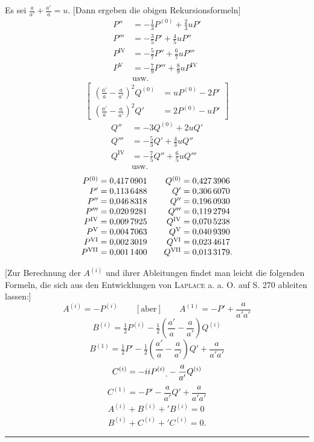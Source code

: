 Es sei \(\frac a{a'}+\frac{a'}a=u\). [Dann ergeben die obigen Rekursionsformeln]
\[
\begin{aligned}
P''&=-\tfrac13P^{(0)}+\tfrac23uP'\\
P'''&=-\tfrac35P'+\tfrac45uP''\\
P^{\mathrm{IV}}&=-\tfrac57P''+\tfrac67uP'''\\
P^{\mathrm{V}}&=-\tfrac79P'''+\tfrac89uP^{\mathrm{IV}}\\
&\text{usw.}
\end{aligned}
\]
\[
\left[\begin{aligned}
\left(\frac{a'}a-\frac a{a'}\right)^2Q^{(0)}&=uP^{(0)}-2P'\\
\left(\frac{a'}a-\frac a{a'}\right)^2Q'&=2P^{(0)}-uP'
\end{aligned}\right]
\]
\[
\begin{aligned}
Q''&=-3Q^{(0)}+2uQ'\\
Q'''&=-\tfrac53Q'+\tfrac43uQ''\\
Q^{\mathrm{IV}}&=-\tfrac75Q''+\tfrac65uQ'''\\
&\text{usw.}
\end{aligned}
\]
\hypertarget{native-392}{}
\[
\begin{array}{r@{\;}l@{\qquad}r@{\;}l}
P^{(0)}&=0{,}417\,0901&Q^{(0)}&=0{,}427\,3906\\
P'&=0{,}113\,6488&Q'&=0{,}306\,6070\\
P''&=0{,}046\,8318&Q''&=0{,}196\,0930\\
P'''&=0{,}020\,9281&Q'''&=0{,}119\,2794\\
P^{\mathrm{IV}}&=0{,}009\,7925&Q^{\mathrm{IV}}&=0{,}070\,5238\\
P^{\mathrm{V}}&=0{,}004\,7063&Q^{\mathrm{V}}&=0{,}040\,9390\\
P^{\mathrm{VI}}&=0{,}002\,3019&Q^{\mathrm{VI}}&=0{,}023\,4617\\
P^{\mathrm{VII}}&=0{,}001\,1400&Q^{\mathrm{VII}}&=0{,}013\,3179.
\end{array}
\]

[Zur Berechnung der \(A^{(i)}\) und ihrer Ableitungen findet man leicht die folgenden Formeln, die sich aus den Entwicklungen von \textsc{Laplace} a. a. O. auf S. 270 ableiten lassen:]
\[
A^{(i)}=-P^{(i)}\qquad[\text{aber}]\qquad A^{(1)}=-P'+\frac a{a'a'}
\]
\[
B^{(i)}=\tfrac12P^{(i)}-\tfrac12\left(\frac{a'}a-\frac a{a'}\right)Q^{(i)}
\]
\[
B^{(1)}=\tfrac12P'-\tfrac12\left(\frac{a'}a-\frac a{a'}\right)Q'+\frac a{a'a'}
\]
\[
C^{(i)}=-iiP^{(i)}\mathord{\text{\raisebox{-.6ex}{.}}}-\frac a{a'}Q^{(i)}
\]
\[
C^{(1)}=-P'-\frac a{a'}Q'+\frac a{a'a'}
\]
\[
\begin{gathered}
A^{(i)}+B^{(i)}+{}'B^{(i)}=0\\
B^{(i)}+C^{(i)}+{}'C^{(i)}=0.
\end{gathered}
\]
\begin{center}\rule{.18\linewidth}{.3pt}\end{center}
